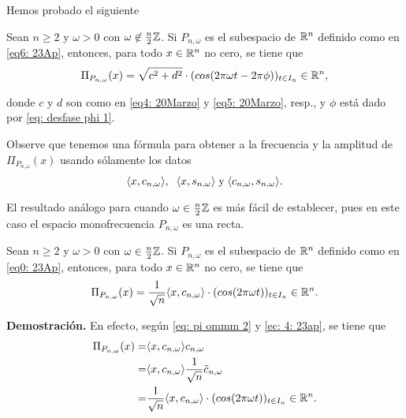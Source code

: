 Hemos probado el siguiente
\begin{teo}
\label{teo: amelie1}
Sean $n \geq 2$ y $\omega > 0$ con $\omega \not\in \frac{n}{2}\mathbb{Z}$.
Si $P_{n, \omega}$ es el subespacio de $\mathbb{R}^{n}$ definido como 
en \eqref{eq6: 23Ap}, entonces, para todo 
$x \in \mathbb{R}^{n}$ no cero, se tiene que
\begin{equation}
\label{ec: desfase explicito 1}
\Pi_{P_{n, \omega}} (x) = \sqrt{c^{2}+d^{2}} \cdot (
cos (2 \pi \omega t - 2 \pi \phi)
)_{t \in I_{n}} \in \mathbb{R}^{n},
\end{equation}

\noindent
donde 
$c$ y $d$ son como en \eqref{eq4: 20Marzo} y 
\eqref{eq5: 20Marzo}, resp., y $\phi$ está 
dado por \eqref{eq: desfase phi 1}.
\end{teo}
Observe que tenemos una fórmula para obtener a
la frecuencia y la amplitud de $\Pi_{P_{n, \omega}}(x)$
usando sólamente los datos
\[
\langle x, c_{n, \omega} \rangle, \hspace{0.2cm}
\langle x, s_{n, \omega} \rangle \hspace{0.1cm} \text{y} \hspace{0.1cm}
\langle c_{n, \omega}, s_{n, \omega} \rangle.
\]

El resultado análogo para cuando $\omega \in \frac{n}{2}\mathbb{Z}$
es más fácil de establecer, pues en este caso
el espacio monofrecuencia $P_{n, \omega}$ es una recta.

\begin{teo}
\label{teo: amelie2}
Sean $n \geq 2$ y $\omega > 0$ con $\omega \in \frac{n}{2}\mathbb{Z}$.
Si $P_{n, \omega}$ es el subespacio de $\mathbb{R}^{n}$ definido como 
en \eqref{eq0: 23Ap}, entonces, para todo 
$x \in \mathbb{R}^{n}$ no cero, se tiene que
\begin{equation}
\label{ec: desfase explicito 2}
\Pi_{P_{n, \omega}} (x) = 
\frac{1}{\sqrt{n}} \langle x, c_{n, \omega} \rangle
\cdot (cos (2 \pi \omega t))_{t \in I_{n}} \in \mathbb{R}^{n}.
\end{equation}
\end{teo}
\noindent
\textbf{Demostración.}
En efecto, según \eqref{eq: pi ommm 2} y 
\eqref{ec: 4: 23ap},
se tiene que
\begin{align*}
\Pi_{P_{n, \omega}} (x) = & 
\langle x, c_{n, \omega} \rangle c_{n, \omega} \\
= & \langle x, c_{n, \omega} \rangle \frac{1}{\sqrt{n}} \tilde{c}_{n, \omega} \\
= & \frac{1}{\sqrt{n}} \langle x, c_{n, \omega} \rangle
\cdot (cos (2 \pi \omega t))_{t \in I_{n}} \in \mathbb{R}^{n}.
\end{align*}

\QEDB
\vspace{0.2cm}


